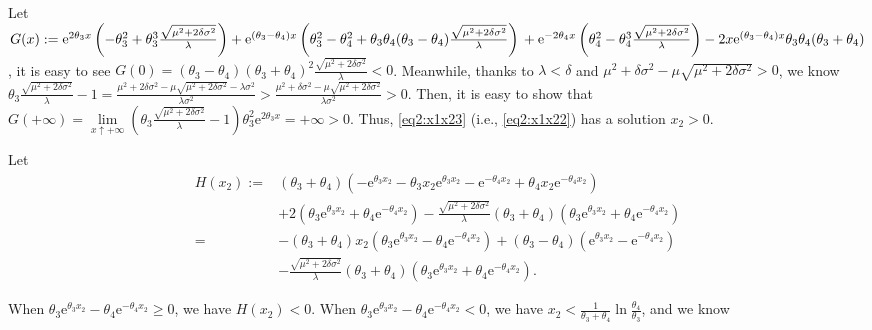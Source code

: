\documentclass[11pt,reqno]{article}%
\numberwithin{equation}{section}
\begin{document}
Let $G(x):=\mathrm{e}^{2\theta_{3}x}\left(-\theta_{3}^2+\theta_{3}^3\frac{\sqrt{\mu^2 + 2 \delta \sigma^2}}{\lambda}\right)+\mathrm{e}^{(\theta_{3}-\theta_{4})x}\left(\theta_{3}^2-\theta_{4}^2+\theta_{3}\theta_{4}(\theta_{3}-\theta_{4})\frac{\sqrt{\mu^2 + 2 \delta \sigma^2}}{\lambda}\right)\\+\mathrm{e}^{-2\theta_{4}x}\left(\theta_{4}^2-\theta_{4}^3\frac{\sqrt{\mu^2 + 2 \delta \sigma^2}}{\lambda}\right)-2x\mathrm{e}^{(\theta_{3}-\theta_{4})x}\theta_{3}\theta_{4}(\theta_{3}+\theta_{4})$, it is easy to see $G(0)=(\theta_{3}- \theta_{4})(\theta_{3}+\theta_{4})^2\frac{\sqrt{\mu^2 + 2 \delta \sigma^2}}{\lambda}<0$. Meanwhile, thanks to $\lambda<\delta$ and $\mu^2 +  \delta \sigma^2-\mu\sqrt{\mu^2 + 2 \delta \sigma^2}>0$, we know $\theta_3\frac{\sqrt{\mu^2 + 2 \delta \sigma^2}}{\lambda}-1=\frac{\mu^2 +  2\delta \sigma^2-\mu\sqrt{\mu^2 + 2 \delta \sigma^2}-\lambda \sigma^2}{\lambda \sigma^2}>\frac{\mu^2 +  \delta \sigma^2-\mu\sqrt{\mu^2 + 2 \delta \sigma^2}}{\lambda \sigma^2}>0$. Then, it is easy to show that $G(+\infty)=\lim\limits_{x\uparrow +\infty}\left(\theta_3\frac{\sqrt{\mu^2 + 2 \delta \sigma^2}}{\lambda}-1\right)\theta_3^2\mathrm{e}^{2\theta_{3}x}=+\infty>0$. Thus, \eqref{eq2:x1x23} (i.e., \eqref{eq2:x1x22}) has a solution $x_2>0$. %

Let
\begin{equation}\nonumber
\begin{aligned}
H(x_2):=&(\theta_3+\theta_4)\left(-\mathrm{e}^{\theta_{3}x_2}-\theta_{3}x_2\mathrm{e}^{\theta_{3}x_2}-\mathrm{e}^{-\theta_{4}x_2}+\theta_{4}x_2\mathrm{e}^{-\theta_{4}x_2}\right)\\&+2\left(\theta_{3} \mathrm{e}^{\theta_{3}x_2}+\theta_{4}\mathrm{e}^{-\theta_{4}x_2}\right)-\frac{\sqrt{\mu^2 + 2 \delta \sigma^2}}{\lambda }(\theta_3+\theta_4)\left(\theta_{3} \mathrm{e}^{\theta_{3}x_2}+\theta_{4}\mathrm{e}^{-\theta_{4}x_2}\right)\\
=&-(\theta_3+\theta_4)x_2\left(\theta_{3} \mathrm{e}^{\theta_{3}x_2}-\theta_{4}\mathrm{e}^{-\theta_{4}x_2}\right)+(\theta_3-\theta_4)\left(\mathrm{e}^{\theta_{3}x_2}-\mathrm{e}^{-\theta_{4}x_2}\right)\\&-\frac{\sqrt{\mu^2 + 2 \delta \sigma^2}}{\lambda }(\theta_3+\theta_4)\left(\theta_{3} \mathrm{e}^{\theta_{3}x_2}+\theta_{4}\mathrm{e}^{-\theta_{4}x_2}\right).\end{aligned}
\end{equation}

When $\theta_{3} \mathrm{e}^{\theta_{3}x_2}-\theta_{4}\mathrm{e}^{-\theta_{4}x_2}\ge 0$, we have $H(x_2)<0$. When $\theta_{3} \mathrm{e}^{\theta_{3}x_2}-\theta_{4}\mathrm{e}^{-\theta_{4}x_2}< 0$, we have $x_2<\frac{1}{\theta_3+\theta_4}\ln{\frac{\theta_{4}}{\theta_{3}}}$, and we know
\end{document}
